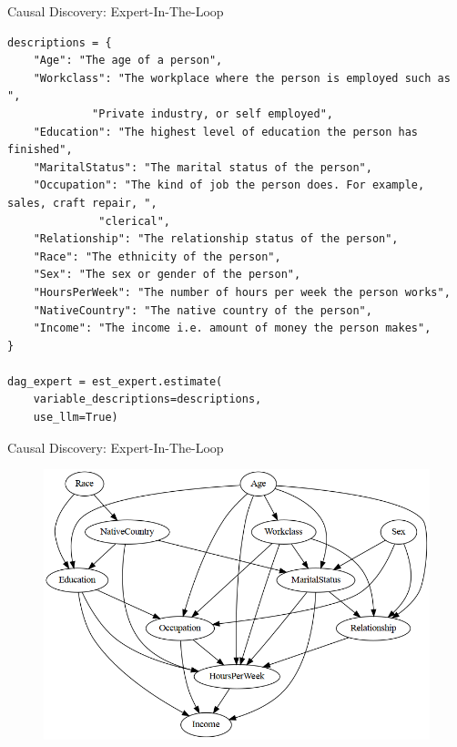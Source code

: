\documentclass[aspectratio=169]{beamer}
\begin{document}
\begin{frame}[fragile]{Causal Discovery: Expert-In-The-Loop}
	\begin{verbatim}
descriptions = {
    "Age": "The age of a person",
    "Workclass": "The workplace where the person is employed such as ",
    		 "Private industry, or self employed",
    "Education": "The highest level of education the person has finished",
    "MaritalStatus": "The marital status of the person",
    "Occupation": "The kind of job the person does. For example, sales, craft repair, ",
    		  "clerical",
    "Relationship": "The relationship status of the person",
    "Race": "The ethnicity of the person",
    "Sex": "The sex or gender of the person",
    "HoursPerWeek": "The number of hours per week the person works",
    "NativeCountry": "The native country of the person",
    "Income": "The income i.e. amount of money the person makes",
}

dag_expert = est_expert.estimate(
    variable_descriptions=descriptions,
    use_llm=True)
	\end{verbatim}
\end{frame}

\begin{frame}{Causal Discovery: Expert-In-The-Loop}
	\begin{figure}
		\centering
		\includegraphics[scale=0.35]{imgs/adult_llm.png}
	\end{figure}
\end{frame}

\end{document}

